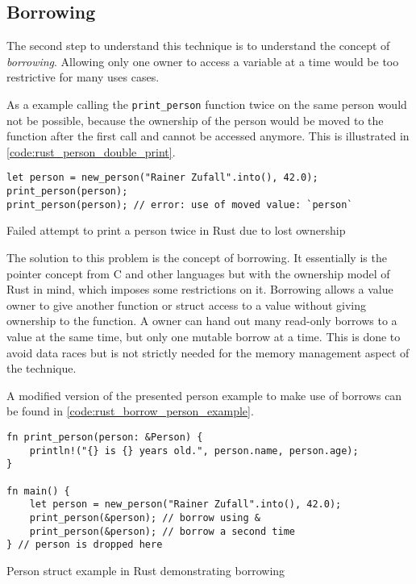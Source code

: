 \subsection{Borrowing}

The second step to understand this technique is to understand the concept of \textit{borrowing}.
Allowing only one owner to access a variable at a time would be too restrictive
for many uses cases.

As a example calling the \texttt{print\_person} function twice on the same person
would not be possible, because the ownership of the person would be moved to the
function after the first call and cannot be accessed anymore.
This is illustrated in \autoref{code:rust_person_double_print}.

\begin{listing}[H] 
    \begin{verbatim}
let person = new_person("Rainer Zufall".into(), 42.0);
print_person(person);
print_person(person); // error: use of moved value: `person`
    \end{verbatim}
    \caption{Failed attempt to print a person twice in Rust due to lost ownership}
    \label{code:rust_person_double_print}
\end{listing}


The solution to this problem is the concept of borrowing.
It essentially is the pointer concept from C and other languages but with
the ownership model of Rust in mind, which imposes some restrictions on it.
Borrowing allows a value owner to give another function or struct
access to a value without giving ownership to the function.
A owner can hand out many read-only borrows to a value at the same time,
but only one mutable borrow at a time. This is done to avoid data races but
is not strictly needed for the memory management aspect of the technique.

A modified version of the presented person example to make use of borrows
can be found in \autoref{code:rust_borrow_person_example}.

\begin{listing}[H] 
    \begin{verbatim}
fn print_person(person: &Person) {
    println!("{} is {} years old.", person.name, person.age);
}

fn main() {
    let person = new_person("Rainer Zufall".into(), 42.0);
    print_person(&person); // borrow using &
    print_person(&person); // borrow a second time
} // person is dropped here
    \end{verbatim}
    \caption{Person struct example in Rust demonstrating borrowing}
    \label{code:rust_borrow_person_example}
\end{listing}

